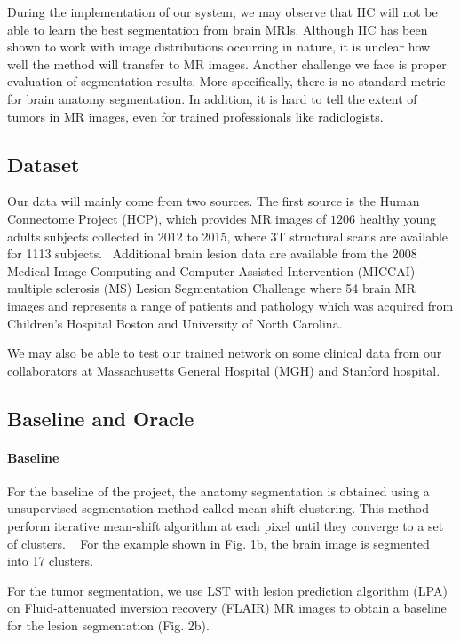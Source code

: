 \documentclass{article}
\begin{document}
During the implementation of our system, we may observe that IIC will not be able to learn the best segmentation from brain MRIs. Although IIC has been shown to work with image distributions occurring in nature, it is unclear how well the method will transfer to MR images. Another challenge we face is proper evaluation of segmentation results. More specifically, there is no standard metric for brain anatomy segmentation. In addition, it is hard to tell the extent of tumors in MR images, even for trained professionals like radiologists.

\subsection{Dataset}
Our data will mainly come from two sources. The first source is the Human Connectome Project (HCP), which provides MR images of $1206$ healthy young adults subjects collected in 2012 to 2015, where 3T structural scans are available for 1113 subjects.~\cite{van2012human} Additional brain lesion data are available from the 2008 Medical Image Computing and Computer Assisted Intervention (MICCAI) multiple sclerosis (MS) Lesion Segmentation Challenge where 54 brain MR images and represents a range of patients and pathology which was acquired from Children's Hospital Boston and University of North Carolina.~\cite{miccai2008}

We may also be able to test our trained network on some clinical data from our collaborators at Massachusetts General Hospital (MGH) and Stanford hospital.

\subsection{Baseline and Oracle}
\paragraph{Baseline}
For the baseline of the project, the anatomy segmentation is obtained using a unsupervised segmentation method called mean-shift clustering. This method perform iterative mean-shift algorithm at each pixel until they converge to a set of clusters. ~\cite{comaniciu1999mean} For the example shown in Fig. 1b, the brain image is segmented into 17 clusters.

For the tumor segmentation, we use LST with lesion prediction algorithm (LPA) on Fluid-attenuated inversion recovery (FLAIR) MR images to obtain a baseline for the lesion segmentation (Fig. 2b).~\cite{ediss20373}
\end{document}
